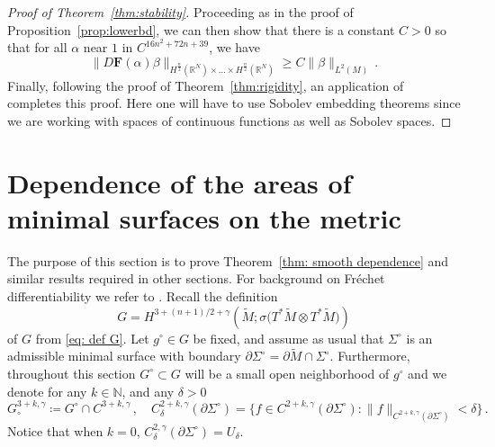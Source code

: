 \documentclass[11pt]{amsart}
\theoremstyle{definition}
\numberwithin{equation}{section}
\newcommand{\mR}{\mathbb{R}}                    %
\newcommand{\norm}[1]{\lVert #1 \rVert}         %
\newcommand{\p}{\partial}
\begin{document}
\begin{proof}[Proof of Theorem~\ref{thm:stability}]
	Proceeding as in the proof of Proposition~\ref{prop:lowerbd}, we can then show that there is a constant $C>0$ so that for all $\alpha$ near $1$ in $C^{16n^2+72n+39}$, we have
	\[
		\norm{D\mathbf{F}(\alpha)\beta}_{H^{\frac{n}{2}}(\mR^{N})\times\dots\times H^{\frac{n}{2}}(\mR^{N})} \geq C\norm{\beta}_{L^2(M)}\,.
	\]
	Finally, following the proof of Theorem~\ref{thm:rigidity}, an application of \cite[Thm.~2(b)]{stefanov2009linearizing} completes this proof. Here one will have to use Sobolev embedding theorems since we are working with spaces of continuous functions as well as Sobolev spaces.
\end{proof}


\appendix

\section{Dependence of the areas of minimal surfaces on the metric}\label{subsec:implicitfunc} 

The purpose of this section is to prove Theorem~\ref{thm: smooth dependence} and similar results required in other sections. For background on Fr\'echet differentiability we refer to \cite{MR960687}. Recall the definition 
\begin{equation*}%
G =%
H^{3+(n+1)/2 + \gamma}\left(\widetilde{M}; \sigma\big(T^*\widetilde{M} \otimes T^*\widetilde{M}\big)\right) 
\end{equation*}
of $G$ from \eqref{eq: def G}. Let $g^\circ \in G$ be fixed, and assume as usual that $\Sigma^\circ$ is an admissible minimal surface with boundary $\partial \Sigma^\circ = \partial \widetilde{M} \cap \Sigma^\circ$. %
Furthermore, throughout this section $G^\circ \subset G$ will be a small open neighborhood of $g^\circ$ and we denote for any $k\in\mathbb{N}$, and any $\delta >0$
\[
	G^{3+k,\gamma}_\circ \coloneqq G^\circ \cap C^{3+k,\gamma}\,,\quad C^{2+k,\gamma}_\delta(\partial\Sigma^\circ) = \{f \in C^{2+k,\gamma}(\p \Sigma^\circ)\colon \norm{f}_{C^{2+k,\gamma}(\p \Sigma^\circ)} < \delta\}\,.
\]
Notice that when $k = 0$, $C^{2,\gamma}_\delta(\partial\Sigma^\circ) = U_\delta$. 
\end{document}

